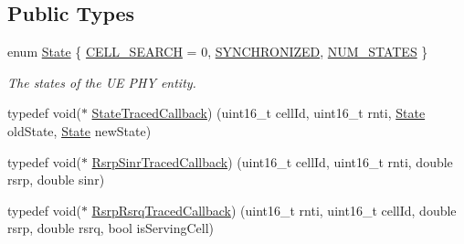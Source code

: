 \subsection*{Public Types}
\begin{DoxyCompactItemize}
\item 
enum \hyperlink{classns3_1_1LteUePhy_ae5118801f100c494663f0ca1e942aa31}{State} \{ \hyperlink{classns3_1_1LteUePhy_ae5118801f100c494663f0ca1e942aa31a5da02705337a130a4e573ae825e8ef70}{C\+E\+L\+L\+\_\+\+S\+E\+A\+R\+CH} = 0, 
\hyperlink{classns3_1_1LteUePhy_ae5118801f100c494663f0ca1e942aa31a261de2b3c11a29a7f243eda6a79f101a}{S\+Y\+N\+C\+H\+R\+O\+N\+I\+Z\+ED}, 
\hyperlink{classns3_1_1LteUePhy_ae5118801f100c494663f0ca1e942aa31a8aea48575aefb1e651a060747a19ae63}{N\+U\+M\+\_\+\+S\+T\+A\+T\+ES}
 \}\begin{DoxyCompactList}\small\item\em The states of the UE P\+HY entity. \end{DoxyCompactList}
\item 
typedef void($\ast$ \hyperlink{classns3_1_1LteUePhy_a9bcc5b2a751416bcc55a2549f935cd9b}{State\+Traced\+Callback}) (uint16\+\_\+t cell\+Id, uint16\+\_\+t rnti, \hyperlink{classns3_1_1LteUePhy_ae5118801f100c494663f0ca1e942aa31}{State} old\+State, \hyperlink{classns3_1_1LteUePhy_ae5118801f100c494663f0ca1e942aa31}{State} new\+State)
\item 
typedef void($\ast$ \hyperlink{classns3_1_1LteUePhy_a1b46efe4c9944e2feef8671cb4a66aa2}{Rsrp\+Sinr\+Traced\+Callback}) (uint16\+\_\+t cell\+Id, uint16\+\_\+t rnti, double rsrp, double sinr)
\item 
typedef void($\ast$ \hyperlink{classns3_1_1LteUePhy_a66744bd6ca4f21fc222cd6b80d7c089b}{Rsrp\+Rsrq\+Traced\+Callback}) (uint16\+\_\+t rnti, uint16\+\_\+t cell\+Id, double rsrp, double rsrq, bool is\+Serving\+Cell)
\end{DoxyCompactItemize}
